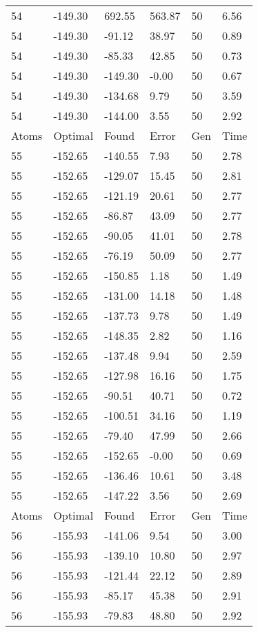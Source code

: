 \documentclass{report}
\begin{document}
\begin{appendix}
\begin{longtable}{llllll}
54 & -149.30 & 692.55 & 563.87 & 50 & 6.56 \\
54 & -149.30 & -91.12 & 38.97 & 50 & 0.89 \\
54 & -149.30 & -85.33 & 42.85 & 50 & 0.73 \\
54 & -149.30 & -149.30 & -0.00 & 50 & 0.67 \\
54 & -149.30 & -134.68 & 9.79 & 50 & 3.59 \\
54 & -149.30 & -144.00 & 3.55 & 50 & 2.92 \\
Atoms & Optimal & Found & Error & Gen & Time \\
55 & -152.65 & -140.55 & 7.93 & 50 & 2.78 \\
55 & -152.65 & -129.07 & 15.45 & 50 & 2.81 \\
55 & -152.65 & -121.19 & 20.61 & 50 & 2.77 \\
55 & -152.65 & -86.87 & 43.09 & 50 & 2.77 \\
55 & -152.65 & -90.05 & 41.01 & 50 & 2.78 \\
55 & -152.65 & -76.19 & 50.09 & 50 & 2.77 \\
55 & -152.65 & -150.85 & 1.18 & 50 & 1.49 \\
55 & -152.65 & -131.00 & 14.18 & 50 & 1.48 \\
55 & -152.65 & -137.73 & 9.78 & 50 & 1.49 \\
55 & -152.65 & -148.35 & 2.82 & 50 & 1.16 \\
55 & -152.65 & -137.48 & 9.94 & 50 & 2.59 \\
55 & -152.65 & -127.98 & 16.16 & 50 & 1.75 \\
55 & -152.65 & -90.51 & 40.71 & 50 & 0.72 \\
55 & -152.65 & -100.51 & 34.16 & 50 & 1.19 \\
55 & -152.65 & -79.40 & 47.99 & 50 & 2.66 \\
55 & -152.65 & -152.65 & -0.00 & 50 & 0.69 \\
55 & -152.65 & -136.46 & 10.61 & 50 & 3.48 \\
55 & -152.65 & -147.22 & 3.56 & 50 & 2.69 \\
Atoms & Optimal & Found & Error & Gen & Time \\
56 & -155.93 & -141.06 & 9.54 & 50 & 3.00 \\
56 & -155.93 & -139.10 & 10.80 & 50 & 2.97 \\
56 & -155.93 & -121.44 & 22.12 & 50 & 2.89 \\
56 & -155.93 & -85.17 & 45.38 & 50 & 2.91 \\
56 & -155.93 & -79.83 & 48.80 & 50 & 2.92 \\

\end{longtable}
\end{appendix}
\end{document}
